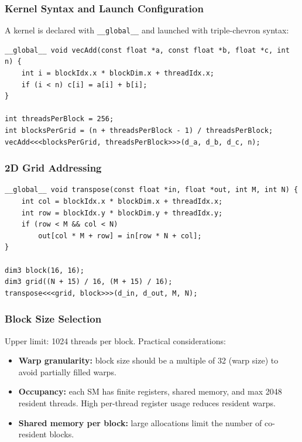 \documentclass{article}
\begin{document}
\subsubsection{Kernel Syntax and Launch Configuration}
A kernel is declared with \lstinline[language=CUDA]{__global__} and launched with triple-chevron syntax:

\begin{lstlisting}[language=CUDA,caption={Vector addition kernel}]
__global__ void vecAdd(const float *a, const float *b, float *c, int n) {
    int i = blockIdx.x * blockDim.x + threadIdx.x;
    if (i < n) c[i] = a[i] + b[i];
}

int threadsPerBlock = 256;
int blocksPerGrid = (n + threadsPerBlock - 1) / threadsPerBlock;
vecAdd<<<blocksPerGrid, threadsPerBlock>>>(d_a, d_b, d_c, n);
\end{lstlisting}

\subsubsection{2D Grid Addressing}
\begin{lstlisting}[language=CUDA,caption={Matrix transpose with 2D grid}]
__global__ void transpose(const float *in, float *out, int M, int N) {
    int col = blockIdx.x * blockDim.x + threadIdx.x;
    int row = blockIdx.y * blockDim.y + threadIdx.y;
    if (row < M && col < N)
        out[col * M + row] = in[row * N + col];
}

dim3 block(16, 16);
dim3 grid((N + 15) / 16, (M + 15) / 16);
transpose<<<grid, block>>>(d_in, d_out, M, N);
\end{lstlisting}

\subsubsection{Block Size Selection}
Upper limit: 1024 threads per block. Practical considerations:

\begin{itemize}
    \item \textbf{Warp granularity:} block size should be a multiple of 32 (warp size) to avoid partially filled warps.
    \item \textbf{Occupancy:} each SM has finite registers, shared memory, and max \num{2048} resident threads. High per-thread register usage reduces resident warps.
    \item \textbf{Shared memory per block:} large allocations limit the number of co-resident blocks.
\end{itemize}
\end{document}
